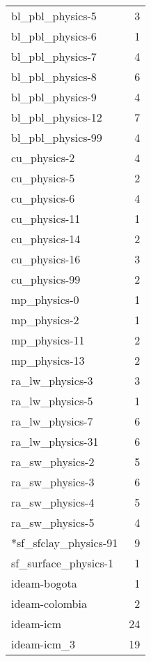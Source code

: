 \begin{itemize}
\begin{table}[H]
\begin{tabular}{lr}
bl\_pbl\_physics-5     &      3 \\
bl\_pbl\_physics-6     &      1 \\
bl\_pbl\_physics-7     &      4 \\
bl\_pbl\_physics-8     &      6 \\
bl\_pbl\_physics-9     &      4 \\
bl\_pbl\_physics-12    &      7 \\
bl\_pbl\_physics-99    &      4 \\ \hline
cu\_physics-2         &      4 \\
cu\_physics-5         &      2 \\
cu\_physics-6         &      4 \\
cu\_physics-11        &      1 \\
cu\_physics-14        &      2 \\
cu\_physics-16        &      3 \\
cu\_physics-99        &      2 \\ \hline
mp\_physics-0         &      1 \\
mp\_physics-2         &      1 \\
mp\_physics-11        &      2 \\
mp\_physics-13        &      2 \\ \hline
ra\_lw\_physics-3      &      3 \\
ra\_lw\_physics-5      &      1 \\
ra\_lw\_physics-7      &      6 \\
ra\_lw\_physics-31     &      6 \\ \hline
ra\_sw\_physics-2      &      5 \\
ra\_sw\_physics-3      &      6 \\
ra\_sw\_physics-4      &      5 \\
ra\_sw\_physics-5      &      4 \\ \hline
*sf\_sfclay\_physics-91 &      9 \\ \hline
sf\_surface\_physics-1 &      1 \\ \hline
ideam-bogota         &      1 \\
ideam-colombia       &      2 \\
ideam-icm            &     24 \\
ideam-icm\_3          &     19 \\


\bottomrule
\end{tabular}
\end{table}


\end{itemize}
